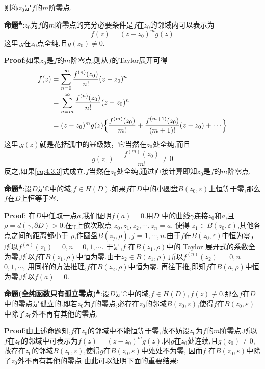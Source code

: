 则称$z_0$是$f$的$m$阶零点.\par
\textbf{命题}$^\clubsuit$:$z_0$为$f$的$m$阶零点的充分必要条件是$f$在$z_0$的邻域内可以表示为
\begin{equation}
    f(z)=(z-z_0)^mg(z) \label{eq:4.3.3}
\end{equation}
这里,$g$在$z_0$点全纯,且$g(z_0)\neq 0$.\par
\textbf{Proof}:如果$z_0$是$f$的$m$阶零点,则从$f$的Taylor展开可得  
$$
\begin{aligned}
    f(z)&=\sum_{n=0}^{\infty}\frac{f^{(n)}(z_0)}{n!}(z-z_0)^n\\
        &=\sum_{n=m}^{\infty}\frac{f^{(n)}(z_0)}{n!}(z-z_0)^n\\
        &=(z-z_0)^mg(z)\Bigl\{\frac{f^{(m)}(z_0)}{m!}+\frac{f^{(m+1)}(z_0)}{(m+1)!}(z-z_0)+\cdots \Bigr\}
\end{aligned}
$$  
这里,$g(z)$就是花括弧中的幂级数，它当然在$z_0$处全纯,而且  
$$
g(z_0)=\frac{f^{(m)}(z_0)}{m!}\neq 0
$$  
反之,如果\eqref{eq:4.3.3}式成立,$f$当然在$z_0$处全纯,通过直接计算即知$z_0$是$f$的$m$阶零点.\par
\textbf{命题}$^\clubsuit$:设$D$是$\mathbb{C}$中的域,$f\in H(D)$.如果$f$在$D$中的小圆盘$B(z_0,\varepsilon)$上恒等于零,那么$f$在$D$上恒等于零.\par
\textbf{Proof}: 在$D$中任取一点$a$,我们证明$f(a)=0.$用$D$ 中的曲线$\gamma$连接$z_{0}$和$a$,且$\rho=d(\gamma,\partial D)>0.$在$\gamma$上依次取点 $z_0,z_1,z_2,\cdots,z_n=a$,
使得 $z_1\in B(z_0,\varepsilon)$,其他各点之间的距离都小于 $\rho$,作圆盘$B( z_j, \rho ) , j$ = $1, \cdots , n$.由于$f$在$B( z_0, \varepsilon )$中恒为零，所以$f^(n)(z_1)=0,n=0,1,\cdots$.
于是,$f$ 在$B(z_1,\rho)$中的 Taylor 展开式的系数全为零,所以$f$在$B(z_1,\rho)$中恒为零.由于$z_2\in B(z_1,\rho)$,所以$f^(n)(z_2)=$ $0, n$ = $0,1,\cdots$, 用同样的方法推理,$f$在$B(z_2,\rho)$中恒为零.
再往下推,即知$f$在$B(a,\rho)$中恒为零,所以$f(a)=0$.\par
\textbf{命题(全纯函数只有孤立零点)}$^\clubsuit$:设$D$是$\mathbb{C}$中的域,$f\in H(D),f(z)\not\equiv 0$.那么$f$在$D$中的零点是孤立的.即若$z_0$为$f$的零点,必存在$z_0$的邻域$B(z_0,\varepsilon)$,使得$f$在$B(z_0,\varepsilon)$中除了$z_0$外不再有其他的零点.\par
\textbf{Proof}:由上述命题知,$f$在$z_0$的邻域中不能恒等于零,故不妨设$z_0$为$f$的$m$阶零点.所以$f$在$z_0$的邻域中可表示为$f(z)=(z-z_0)^mg(z)$,因$g$在$z_0$处连续,且$g(z_0)\neq0$,故存在$z_0$的邻域$B(z_0,\varepsilon)$,使得$g$在$B(z_0,\varepsilon)$中处处不为零,
因而$f$ 在$B(z_0,\varepsilon)$中除了$z_0$外不再有其他的零点
由此可以证明下面的重要结果:
